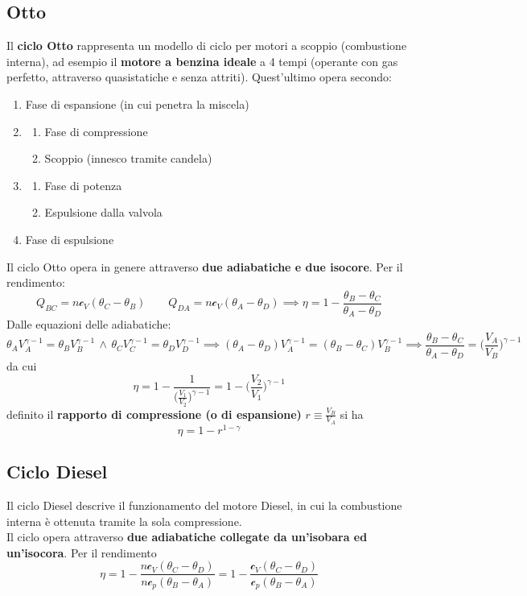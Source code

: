 \documentclass[10pt, oneside]{book}
\newcommand{\ds}{\displaystyle}
\newcommand{\molhtv}{\mathcal{c}_V }
\newcommand{\molhtp}{\mathcal{c}_p }
\begin{document}
\subsection{Otto}
Il \textbf{ciclo Otto} rappresenta un modello di ciclo per motori a scoppio (combustione interna), ad esempio il \textbf{motore a benzina ideale} a 4 tempi (operante con gas perfetto, attraverso quasistatiche e senza attriti). Quest'ultimo opera secondo:
\begin{enumerate}
\item Fase di espansione (in cui penetra la miscela)
\item \begin{enumerate}
\item Fase di compressione
\item Scoppio (innesco tramite candela)
\end{enumerate}
\item \begin{enumerate}
\item Fase di potenza
\item Espulsione dalla valvola
\end{enumerate}
\item Fase di espulsione
\end{enumerate}
Il ciclo Otto opera in genere attraverso \textbf{due adiabatiche e due isocore}. Per il rendimento:
\[Q_{BC} = n \molhtv (\theta_C - \theta_B) \qquad Q_{DA} = n \molhtv (\theta_A - \theta_D) \implies \eta = 1 - \frac{\theta_B - \theta_C}{\theta_A - \theta_D}\]
Dalle equazioni delle adiabatiche:
\[\theta_A V_A^{\gamma - 1} = \theta_B V_B^{\gamma - 1} \, \land \, \theta_C V_C^{\gamma - 1} = \theta_D V_D^{\gamma - 1} \implies (\theta_A - \theta_D) V_A^{\gamma - 1} = (\theta_B - \theta_C) V_B^{\gamma - 1} \implies \frac{\theta_B - \theta_C}{\theta_A - \theta_D} = \bigg(\frac{V_A}{V_B}\bigg)^{\gamma - 1}\]
da cui
\[\eta = 1 - \frac{1}{\bigg(\displaystyle \frac{V_1}{V_2}\bigg)^{\gamma -1}} = 1 - \bigg(\displaystyle \frac{V_2}{V_1}\bigg)^{\gamma -1}\]
definito il \textbf{rapporto di compressione (o di espansione)} $\ds r \equiv \frac{V_B}{V_A}$ si ha
\[\eta = 1 - r^{1 - \gamma}\]

\subsection{Ciclo Diesel}
Il ciclo Diesel descrive il funzionamento del motore Diesel, in cui la combustione interna è ottenuta tramite la sola compressione.\\
Il ciclo opera attraverso \textbf{due adiabatiche collegate da un'isobara ed un'isocora}. Per il rendimento
\[\eta = 1 - \frac{n \molhtv (\theta_C - \theta_D)}{n \molhtp (\theta_B - \theta_A)} = 1 - \frac{\molhtv (\theta_C - \theta_D)}{\molhtp (\theta_B - \theta_A)}\]
\end{document}
